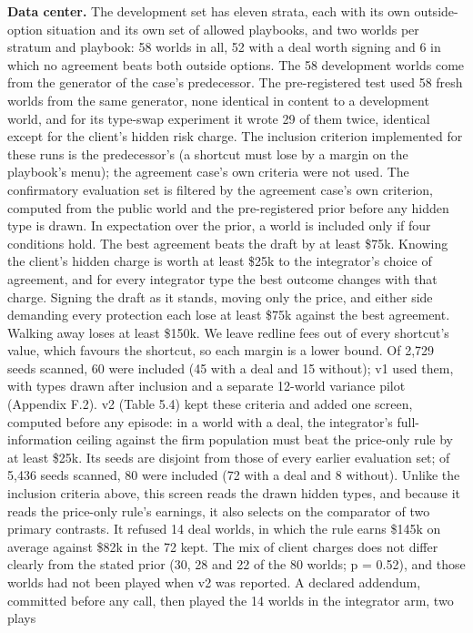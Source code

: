 \textbf{Data center.} The development set has eleven strata, each with its own outside-option situation
and its own set of allowed playbooks, and two worlds per stratum and playbook: 58 worlds in all, 52
with a deal worth signing and 6 in which no agreement beats both outside options. The 58 development
worlds come from the generator of the case's predecessor. The pre-registered test used 58 fresh worlds
from the same generator, none identical in content to a development world, and for its type-swap
experiment it wrote 29 of them twice, identical except for the client's hidden risk charge. The
inclusion criterion implemented for these runs is the predecessor's (a shortcut must lose by a margin
on the playbook's menu); the agreement case's own criteria were not used. The confirmatory evaluation
set is filtered by the agreement case's own criterion, computed from the public world and the
pre-registered prior before any hidden type is drawn. In expectation over the prior, a world is
included only if four conditions hold. The best agreement beats the draft by at least \$75k. Knowing
the client's hidden charge is worth at least \$25k to the integrator's choice of agreement, and for
every integrator type the best outcome changes with that charge. Signing the draft as it stands,
moving only the price, and either side demanding every protection each lose at least \$75k against
the best agreement. Walking away loses at least \$150k. We leave redline fees out of every shortcut's
value, which favours the shortcut, so each margin is a lower bound. Of 2,729 seeds scanned, 60 were
included (45 with a deal and 15 without); v1 used them, with types drawn after inclusion and a
separate 12-world variance pilot (Appendix F.2). v2 (Table 5.4) kept these criteria and added one
screen, computed before any episode: in a world with a deal, the integrator's full-information
ceiling against the firm population must beat the price-only rule by at least \$25k. Its seeds are
disjoint from those of every earlier evaluation set; of 5,436 seeds scanned, 80 were included (72
with a deal and 8 without). Unlike the inclusion criteria above, this screen reads the drawn hidden types, and because it
reads the price-only rule's earnings, it also selects on the comparator of two primary contrasts. It refused 14 deal
worlds, in which the rule earns \$145k on average against \$82k in the 72 kept. The mix of client charges does not differ
clearly from the stated prior (30, 28 and 22 of the 80 worlds; p = 0.52), and those worlds had not been played when v2
was reported. A declared addendum, committed before any call, then played the 14 worlds in the integrator arm, two plays
